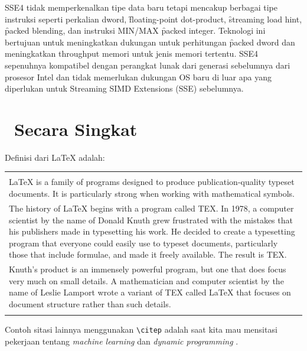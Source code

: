 SSE4 tidak memperkenalkan tipe data baru tetapi mencakup berbagai tipe instruksi seperti perkalian dword, \f{floating-point dot-product}, \f{streaming load hint}, \f{packed blending}, dan instruksi MIN/MAX \f{packed integer}. Teknologi ini bertujuan untuk meningkatkan dukungan untuk perhitungan \f{packed dword} dan meningkatkan throughput memori untuk jenis memori tertentu. SSE4 sepenuhnya kompatibel dengan perangkat lunak dari generasi sebelumnya dari prosesor Intel dan tidak memerlukan dukungan OS baru di luar apa yang diperlukan untuk Streaming SIMD Extensions (SSE) sebelumnya\cite{sse4reference}.


\iffalse
\section{\latex~Secara Singkat}
Definisi dari LaTeX \citep{lankton2008introduction} adalah: \\ 
\begin{tabular}{| p{13cm} |}
	\hline 
	\\
	LaTeX is a family of programs designed to produce publication-quality 
	typeset documents. It is particularly strong when working with 
	mathematical symbols. \\	
	The history of LaTeX begins with a program called TEX. In 1978, a 
	computer scientist by the name of Donald Knuth grew frustrated with the 
	mistakes that his publishers made in typesetting his work. He decided 
	to create a typesetting program that everyone could easily use to 
	typeset documents, particularly those that include formulae, and made 
	it freely available. The result is TEX. \\	
	Knuth's product is an immensely powerful program, but one that does 
	focus very much on small details. A mathematician and computer 
	scientist by the name of Leslie Lamport wrote a variant of TEX called 
	LaTeX that focuses on document structure rather than such details. \\
	\\
	\hline
\end{tabular}

\vspace*{0.8cm}

Contoh sitasi lainnya menggunakan \verb|\citep| adalah saat kita mau mensitasi pekerjaan tentang \textit{machine learning} \citep{chin2000learning} dan \textit{dynamic programming} \citep{barto1995learning}. \\

